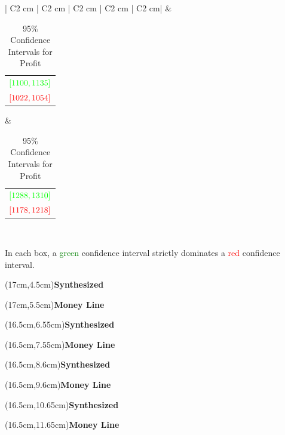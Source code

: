 \documentclass[sn-mathphys-num]{sn-jnl}
\theoremstyle{thmstyleone}%
\theoremstyle{thmstyletwo}%
\theoremstyle{thmstylethree}%
\begin{document}
\begin{center}
\begin{table}[ht]
\begin{tabular}{ | C{2 cm} | C{2 cm} | C{2 cm} | C{2 cm} | C{2 cm}|}
                             & \begin{tabular}{@{}c@{}} $\textcolor{green}{[1100,1135]}$ \\ $\textcolor{red}{[1022,1054]}$ \end{tabular} 
                             & \begin{tabular}{@{}c@{}} $\textcolor{green}{[1288,1310]}$ \\ $\textcolor{red}{[1178,1218]}$ \end{tabular} \\
        \hline
	\end{tabular}
    \begin{tablenotes}
        \item In each box, a \textcolor{green}{green} confidence interval strictly dominates a \textcolor{red}{red} confidence interval.
    \end{tablenotes}
	\caption{95$\%$ Confidence Intervals for Profit}
	\end{table}
\end{center}
\vspace{-15pt}
\begin{textblock*}{7cm}(17cm,4.5cm)\textbf{Synthesized} \end{textblock*} 
\begin{textblock*}{7cm}(17cm,5.5cm)\textbf{Money Line} \end{textblock*} 

\begin{textblock*}{7cm}(16.5cm,6.55cm)\textbf{Synthesized} \end{textblock*} 
\begin{textblock*}{7cm}(16.5cm,7.55cm)\textbf{Money Line} \end{textblock*} 

\begin{textblock*}{7cm}(16.5cm,8.6cm)\textbf{Synthesized} \end{textblock*} 
\begin{textblock*}{7cm}(16.5cm,9.6cm)\textbf{Money Line} \end{textblock*} 

\begin{textblock*}{7cm}(16.5cm,10.65cm)\textbf{Synthesized} \end{textblock*} 
\begin{textblock*}{7cm}(16.5cm,11.65cm)\textbf{Money Line} \end{textblock*} 
\end{document}
